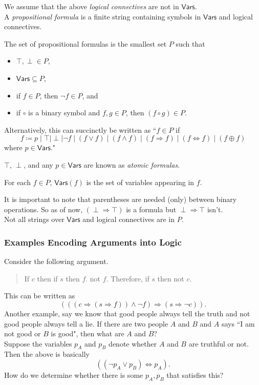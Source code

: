 We assume that the above \textit{logical connectives} are not in $\mathsf{Vars}$.\\
A \textit{propositional formula} is a finite string containing symbols in $\mathsf{Vars}$ and logical connectives.

\begin{definition}
The set of propositional formulas is the smallest set $P$ such that
\begin{itemize}
    \item $\top,\perp\in P$,
    \item $\mathsf{Vars}\subseteq P$,
    \item if $f\in P$, then $\neg f\in P$, and
    \item if $\circ$ is a binary symbol and $f,g\in P$, then $(f\circ g)\in P$.
\end{itemize}
\end{definition}

Alternatively, this can succinctly be written as ``$f \in P$ if
\[f \coloneqq p\mid\top\mid\perp\mid \neg f \mid (f\vee f) \mid (f\wedge f) \mid (f\Rightarrow f) \mid (f\iff f) \mid (f\oplus f) \]
where $p\in\mathsf{Vars}$."

\begin{definition}
$\top$, $\perp$, and any $p\in\mathsf{Vars}$ are known as \textit{atomic formulas}.
\end{definition}

\begin{definition}
For each $f\in P$, $\mathsf{Vars}(f)$ is the set of variables appearing in $f$.
\end{definition}

It is important to note that parentheses are needed (only) between binary operations. So as of now, $(\perp\Rightarrow\top)$ is a formula but $\perp\Rightarrow\top$ isn't.\\
Not all strings over $\mathsf{Vars}$ and logical connectives are in $P$.

\subsubsection{Examples Encoding Arguments into Logic}

Consider the following argument.
\begin{quote}
    If $c$ then if $s$ then $f$. not $f$. Therefore, if $s$ then not $c$.
\end{quote}
This can be written as
\[ (((c\Rightarrow (s\Rightarrow f)) \wedge \neg f) \Rightarrow (s \Rightarrow \neg c)). \]
Another example, say we know that good people always tell the truth and not good people always tell a lie. If there are two people $A$ and $B$ and $A$ says ``I am not good or $B$ is good", then what are $A$ and $B$?\\
Suppose the variables $p_A$ and $p_B$ denote whether $A$ and $B$ are truthful or not. Then the above is basically
\[ ((\neg p_A \vee p_B) \iff p_A). \]
How do we determine whether there is some $p_A,p_B$ that satisfies this?

